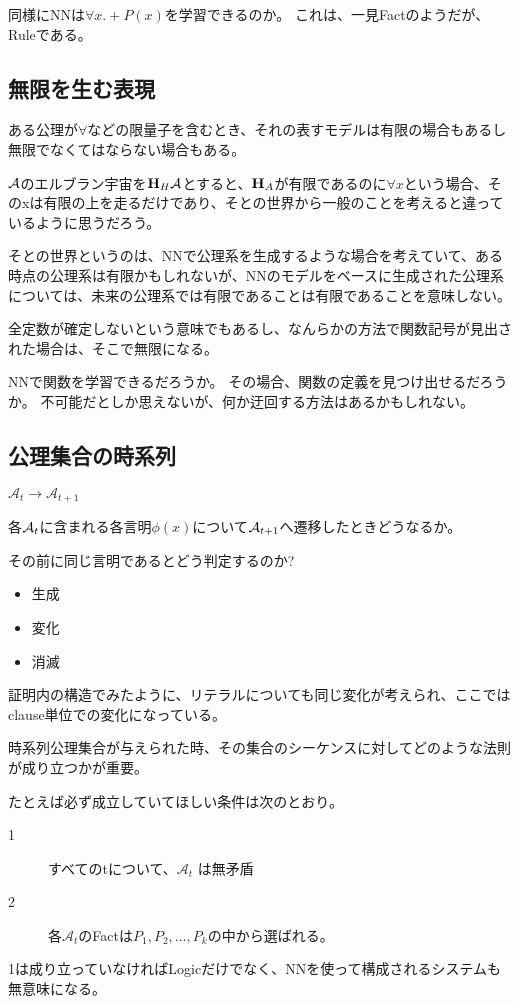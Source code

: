\documentclass[10pt, oneside]{jarticle}   	%
\begin{document}
同様にNNは$\forall x.+P(x)$を学習できるのか。
これは、一見Factのようだが、Ruleである。


\subsection{無限を生む表現}
ある公理が$\forall$などの限量子を含むとき、それの表すモデルは有限の場合もあるし無限でなくてはならない場合もある。

$\mathcal{A}$のエルブラン宇宙を$\mathbf{H}_{H}{\mathcal{A}}$とすると、$\mathbf{H}_{A}$が有限であるのに$\forall x$という場合、そのxは有限の上を走るだけであり、そとの世界から一般のことを考えると違っているように思うだろう。

そとの世界というのは、NNで公理系を生成するような場合を考えていて、ある時点の公理系は有限かもしれないが、NNのモデルをベースに生成された公理系については、未来の公理系では有限であることは有限であることを意味しない。

全定数が確定しないという意味でもあるし、なんらかの方法で関数記号が見出された場合は、そこで無限になる。

NNで関数を学習できるだろうか。
その場合、関数の定義を見つけ出せるだろうか。
不可能だとしか思えないが、何か迂回する方法はあるかもしれない。


\subsection{公理集合の時系列}

$\mathcal{A}_t \to \mathcal{A}_{t+1}$

各$\mathcal{A}_t$に含まれる各言明$\phi(x)$について$\mathcal{A}_{t+1}$へ遷移したときどうなるか。

その前に同じ言明であるとどう判定するのか?

\begin{itemize}
\item 生成
\item 変化
\item 消滅
\end{itemize}

証明内の構造でみたように、リテラルについても同じ変化が考えられ、ここではclause単位での変化になっている。

時系列公理集合が与えられた時、その集合のシーケンスに対してどのような法則が成り立つかが重要。

たとえば必ず成立していてほしい条件は次のとおり。
\begin{description}
\item[ 1] すべてのtについて、$\mathcal{A}_t$  は無矛盾
\item[ 2] 各$\mathcal{A}_t$のFactは$P_1,P_2, \dots, P_k$の中から選ばれる。
\end{description}
1は成り立っていなければLogicだけでなく、NNを使って構成されるシステムも無意味になる。
\end{document}
